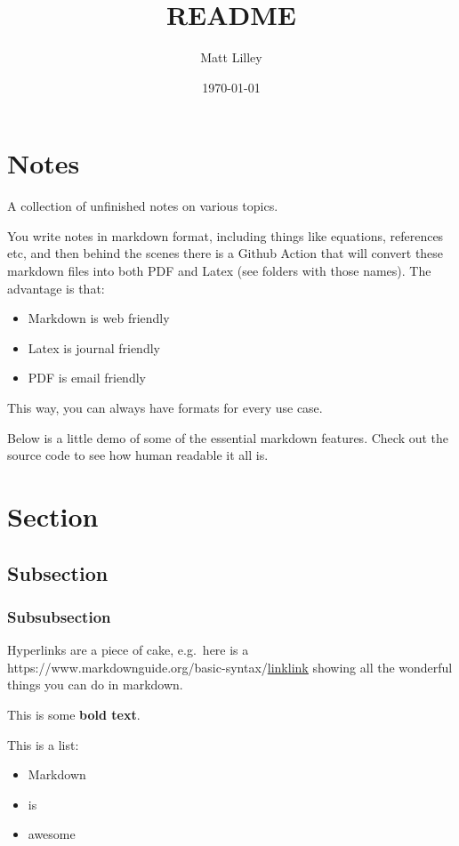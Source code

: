 \documentclass[
]{article}
\title{README}
\author{Matt Lilley}
\date{\today}  %
\let\oldhref\href
\renewcommand{\href}[2]{\ifx#1\urlprefix\oldhref{#1}{#2}\else\uline{\oldhref{#1}{#2}}\fi}
\renewcommand{\[}{\begin{equation}}
\renewcommand{\]}{\end{equation}}
\providecommand{\tightlist}{%
  \setlength{\itemsep}{0pt}\setlength{\parskip}{0pt}}
\begin{document}
\maketitle

\section{Notes}\label{notes}

A collection of unfinished notes on various topics.

You write notes in markdown format, including things like equations,
references etc, and then behind the scenes there is a Github Action that
will convert these markdown files into both PDF and Latex (see folders
with those names). The advantage is that:

\begin{itemize}
\tightlist
\item
  Markdown is web friendly
\item
  Latex is journal friendly
\item
  PDF is email friendly
\end{itemize}

This way, you can always have formats for every use case.

Below is a little demo of some of the essential markdown features. Check
out the source code to see how human readable it all is.

\section{Section}\label{section}

\subsection{Subsection}\label{subsection}

\subsubsection{Subsubsection}\label{subsubsection}

Hyperlinks are a piece of cake, e.g.~here is a
\href{https://www.markdownguide.org/basic-syntax/}{link} showing all the
wonderful things you can do in markdown.

This is some \textbf{bold text}.

This is a list:

\begin{itemize}
\tightlist
\item
  Markdown
\item
  is
\item
  awesome
\end{itemize}
\end{document}
